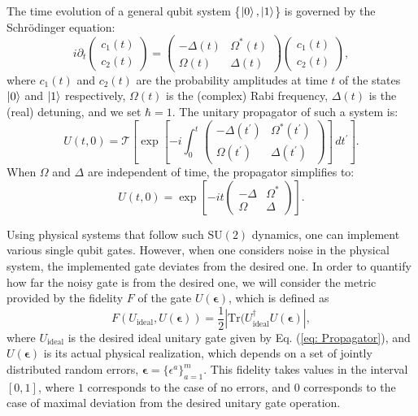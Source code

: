\documentclass[floatfix,reprint, amsmath,amssymb,aps,superscriptaddress,nofootinbib]{revtex4-2}
\newcommand{\bp}{\boldsymbol{\epsilon}}
\begin{document}
The time evolution of a general qubit system \{$\ket{0},\ket{1}$\} is governed by the Schrödinger equation:
\begin{equation}
    i \partial_t \left( \begin{array}{c}
         c_1\left(t\right)\\
         c_2\left(t\right)
    \end{array} \right)=\begin{pmatrix}
-\Delta\left(t\right) & \Omega^*\left(t\right)\\
\Omega\left(t\right) & \Delta\left(t\right)
\end{pmatrix} \left( \begin{array}{c}
         c_1\left(t\right)\\
         c_2\left(t\right)
    \end{array} \right) ,
    \label{eq: Schrödinger}
\end{equation}
where $c_1\left(t\right)$ and $c_2\left(t\right)$ are the probability amplitudes at time $t$ of the states $\ket{0}$ and $\ket{1}$ respectively, $\Omega\left(t\right)$ is the (complex) Rabi frequency, $\Delta\left(t\right)$ is the (real) detuning, and we set $\hbar=1$. The unitary propagator of such a system is:
\begin{equation}
U \left( t,0 \right)=\mathcal{T}\left[\exp{\left[-i \int_0^t \begin{pmatrix}
-\Delta\left(t^\prime\right) & \Omega^*\left(t^\prime\right)\\
\Omega\left(t^\prime\right) & \Delta\left(t^\prime\right)
\end{pmatrix}\right]} \,dt^\prime \right] .
\label{eq: General Propagator}
\end{equation}
When $\Omega$ and $\Delta$ are independent of time, the propagator simplifies to:
\begin{equation}
 U \left( t,0 \right) =\exp{\left[-i t \begin{pmatrix}
    -\Delta & \Omega^*\\
    \Omega & \Delta
    \end{pmatrix}\right]} .
    \label{eq: Propagator}
\end{equation}

Using physical systems that follow such $\mathrm{SU}\left(2\right)$ dynamics, one can implement various single qubit gates. However, when one considers  noise in the physical system, the implemented gate deviates from the desired one. In order to quantify how far the noisy gate is from the desired one, we will consider the metric provided by the fidelity $F$ of the gate $U(\bp)$, which is defined as
\begin{equation}
F(U_\mathrm{ideal},U(\bp))= \frac{1}{2} |\mathrm{Tr}(U_\mathrm{ideal}^{\dagger}U(\bp)| ,
\label{GF}
\end{equation}
where $U_\mathrm{ideal}$ is the desired ideal unitary gate given by Eq. (\ref{eq: Propagator}), and $U(\boldsymbol{\epsilon})$ is its actual physical realization, which depends on a set of jointly distributed random errors, $\bp= \{\epsilon^a\}_{a=1}^m$. This fidelity takes values in the interval $[0,1]$, where $1$ corresponds to the case of no errors, and $0$ corresponds to the case of maximal deviation from the desired unitary gate operation.
\end{document}
